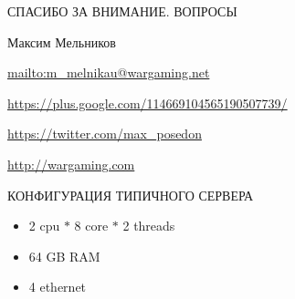 \documentclass[aspectratio=169]{beamer}
\begin{document}
{



\begin{frame}{СПАСИБО ЗА ВНИМАНИЕ. ВОПРОСЫ}
    \begin{block}{Максим Мельников}
    \par \url{mailto:m\_melnikau@wargaming.net}
    \par \url{https://plus.google.com/114669104565190507739/}
    \par \url{https://twitter.com/max\_posedon}
    \par \url{http://wargaming.com}
    \end{block}
\end{frame}
}

\begin{frame}{КОНФИГУРАЦИЯ ТИПИЧНОГО СЕРВЕРА}
    \begin{itemize}
        \item 2 cpu $*$ 8 core $*$ 2 threads
        \item 64 GB RAM
        \item 4 ethernet
    \end{itemize}
\end{frame}
\end{document}
